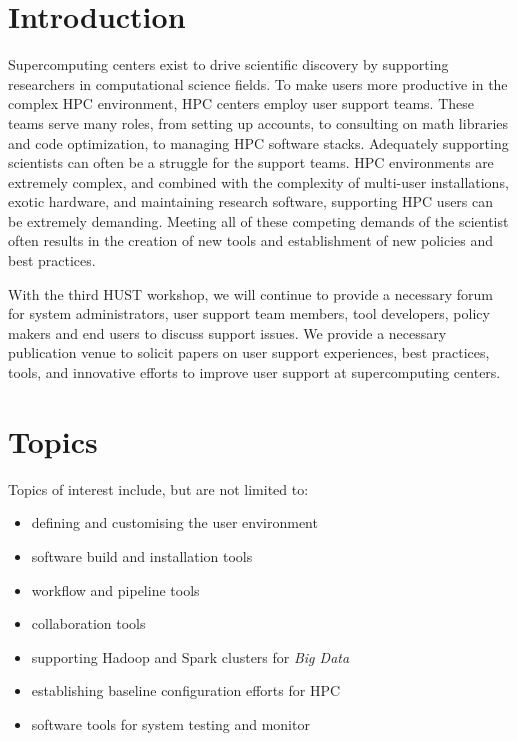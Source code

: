 \documentclass[11pt,a4paper]{article}
\begin{document}
\lhead{}
\rhead{}
\pagestyle{fancy}

\setcounter{page}{2}

\parindent 0pt
\parskip 6pt
\pagebreak
\section{Introduction}

Supercomputing centers exist to drive scientific discovery by
supporting researchers in computational science fields.  To make users
more productive in the complex HPC environment, HPC centers employ
user support teams.  These teams serve many roles, from setting up
accounts, to consulting on math libraries and code optimization, to
managing HPC software stacks.  Adequately supporting scientists can
often be a struggle for the support teams.  HPC environments are
extremely complex, and combined with the complexity of multi-user
installations, exotic hardware, and maintaining research software,
supporting HPC users can be extremely demanding.  Meeting all of these
competing demands of the scientist often results in the creation of
new tools and establishment of new policies and best practices.

With the third HUST workshop, we will continue to provide a necessary
forum for system administrators, user support team members, tool
developers, policy makers and end users to discuss support issues. We provide a 
necessary publication venue to solicit papers on user support experiences, best practices, tools, and
innovative efforts to improve user support at supercomputing centers.

\section{Topics}

Topics of interest include, but are not limited to:

\begin{itemize}
\item defining and customising the user environment
\item software build and installation tools
\item workflow and pipeline tools
\item collaboration tools
\item supporting Hadoop and Spark clusters for \emph{Big Data}
\item establishing baseline configuration efforts for HPC
\item software tools for system testing and monitor
\end{itemize}
\end{document}

